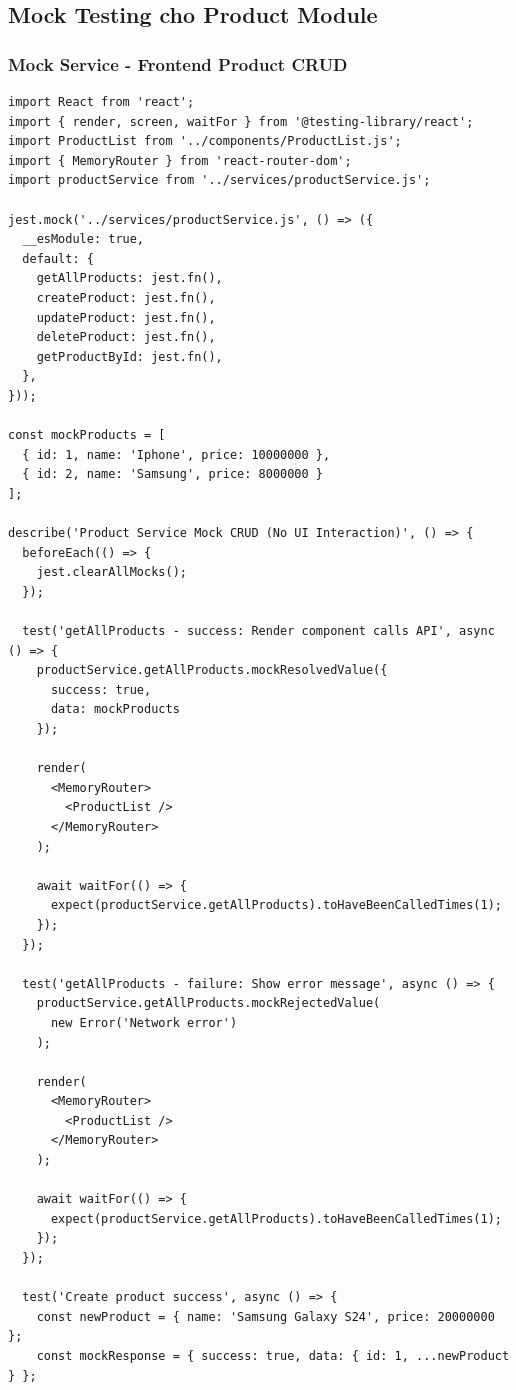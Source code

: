 \subsection{Mock Testing cho Product Module}

\subsubsection{Mock Service - Frontend Product CRUD}
\begin{lstlisting}[caption=Product Service Mock Test - Frontend]
import React from 'react';
import { render, screen, waitFor } from '@testing-library/react';
import ProductList from '../components/ProductList.js';
import { MemoryRouter } from 'react-router-dom';
import productService from '../services/productService.js'; 

jest.mock('../services/productService.js', () => ({
  __esModule: true,
  default: {
    getAllProducts: jest.fn(),
    createProduct: jest.fn(),
    updateProduct: jest.fn(),
    deleteProduct: jest.fn(),
    getProductById: jest.fn(),
  },
}));

const mockProducts = [
  { id: 1, name: 'Iphone', price: 10000000 },
  { id: 2, name: 'Samsung', price: 8000000 }
];

describe('Product Service Mock CRUD (No UI Interaction)', () => {
  beforeEach(() => {
    jest.clearAllMocks();
  });

  test('getAllProducts - success: Render component calls API', async () => {
    productService.getAllProducts.mockResolvedValue({ 
      success: true, 
      data: mockProducts 
    });

    render(
      <MemoryRouter>
        <ProductList />
      </MemoryRouter>
    );

    await waitFor(() => {
      expect(productService.getAllProducts).toHaveBeenCalledTimes(1);
    });
  });

  test('getAllProducts - failure: Show error message', async () => {
    productService.getAllProducts.mockRejectedValue(
      new Error('Network error')
    );

    render(
      <MemoryRouter>
        <ProductList />
      </MemoryRouter>
    );

    await waitFor(() => {
      expect(productService.getAllProducts).toHaveBeenCalledTimes(1);
    });
  });

  test('Create product success', async () => {
    const newProduct = { name: 'Samsung Galaxy S24', price: 20000000 };
    const mockResponse = { success: true, data: { id: 1, ...newProduct } };
    

\end{lstlisting}
